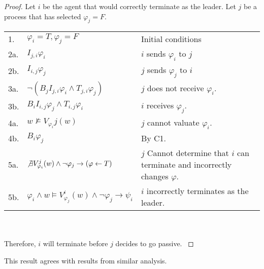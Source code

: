 \begin{proof}
Let $i$ be the agent that would correctly terminate as the leader. Let $j$ be a process that has selected $\varphi_j = F$.

\begin{table}[H]
\centering
\small
\begin{tabularx}{\linewidth}{l X X}
1. & $\varphi_i = T, \varphi_j = F$ & Initial conditions \\
2a.& $I_{j,i} \varphi_i$ & $i$ sends $\varphi_i$ to $j$ \\
2b.& $I_{i,j} \varphi_j$ & $j$ sends $\varphi_j$ to $i$ \\
3a.& $\neg (B_j I_{j,i} \varphi_i \wedge T_{j,i} \varphi_j)$ & $j$ does not receive $\varphi_i$. \\
3b.& $B_i I_{i,j} \varphi_j \wedge T_{i,j} \varphi_i$ & $i$ receives $\varphi_j$. \\
4a.& $w \not \vDash V_{\varphi_i}{j}(w)$ & $j$ cannot valuate $\varphi_i$. \\
4b.& $B_i \varphi_j$ & By C1. \\
5a. & $\not \exists V_{\varphi_i}^j(w) \wedge \neg \varphi_j \rightarrow (\varphi \gets T)$ & $j$ Cannot determine that $i$ can terminate and incorrectly changes $\varphi$. \\
5b. & $\varphi_i \wedge w \vDash V_{\varphi_j}^i(w) \wedge \neg \varphi_j \rightarrow \psi_i$ & $i$ incorrectly terminates as the leader. \\

\end{tabularx} \\~\\
Therefore, $i$ will terminate before $j$ decides to go passive.
\label{tab:anonymityproof}
\end{table}
\end{proof}

This result agrees with results from similar analysis\cite{anon-omission}.




